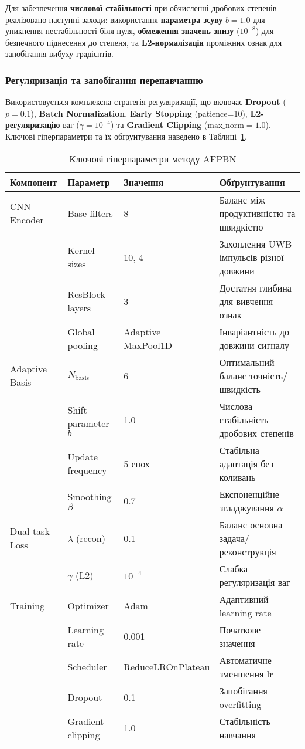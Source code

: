 \documentclass[12pt,a4paper]{article}
\begin{document}
Для забезпечення \textbf{числової стабільності} при обчисленні дробових степенів реалізовано наступні заходи: використання \textbf{параметра зсуву} $b=1.0$ для уникнення нестабільності біля нуля, \textbf{обмеження значень знизу} ($10^{-8}$) для безпечного піднесення до степеня, та \textbf{L2-нормалізація} проміжних ознак для запобігання вибуху градієнтів.

\subsubsection{Регуляризація та запобігання перенавчанню}
Використовується комплексна стратегія регуляризації, що включає \textbf{Dropout} ($p=0.1$), \textbf{Batch Normalization}, \textbf{Early Stopping} (patience=10), \textbf{L2-регуляризацію} ваг ($\gamma=10^{-4}$) та \textbf{Gradient Clipping} ($\text{max\_norm}=1.0$). Ключові гіперпараметри та їх обґрунтування наведено в Таблиці~\ref{tab:hyperparameters}.

\begin{table}[htbp]
	\centering
	\caption{Ключові гіперпараметри методу AFPBN}
	\label{tab:hyperparameters}
	\begin{tabular}{@{}p{2.5cm}p{3cm}p{2cm}p{5cm}@{}}
		\toprule
		\textbf{Компонент} & \textbf{Параметр} & \textbf{Значення} & \textbf{Обґрунтування} \\
		\midrule
		CNN Encoder & Base filters & 8 & Баланс між продуктивністю та швидкістю \\
		& Kernel sizes & 10, 4 & Захоплення UWB імпульсів різної довжини \\
		& ResBlock layers & 3 & Достатня глибина для вивчення ознак \\
		& Global pooling & Adaptive MaxPool1D & Інваріантність до довжини сигналу \\
		\midrule
		Adaptive Basis & $N_{\text{basis}}$ & 6 & Оптимальний баланс точність/швидкість \\
		& Shift parameter $b$ & 1.0 & Числова стабільність дробових степенів \\
		& Update frequency & 5 епох & Стабільна адаптація без коливань \\
		& Smoothing $\beta$ & 0.7 & Експоненційне згладжування $\alpha$ \\
		\midrule
		Dual-task Loss & $\lambda$ (recon) & 0.1 & Баланс основна задача/реконструкція \\
		& $\gamma$ (L2) & $10^{-4}$ & Слабка регуляризація ваг \\
		\midrule
		Training & Optimizer & Adam & Адаптивний learning rate \\
		& Learning rate & 0.001 & Початкове значення \\
		& Scheduler & ReduceLROnPlateau & Автоматичне зменшення lr \\
		& Dropout & 0.1 & Запобігання overfitting \\
		& Gradient clipping & 1.0 & Стабільність навчання \\
		\bottomrule
	\end{tabular}
\end{table}
\end{document}
